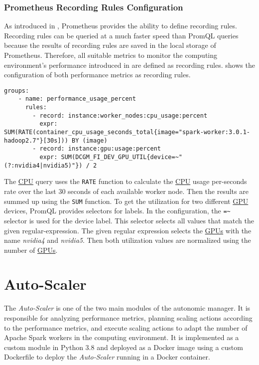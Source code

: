 \subsubsection{Prometheus Recording Rules Configuration}
%
As introduced in , Prometheus provides the ability to define recording rules. Recording rules can be queried at a much faster speed than PromQL queries because the results of recording rules are saved in the local storage of Prometheus.
%
Therefore, all suitable metrics to monitor the computing environment's performance introduced in  are defined as recording rules.
%
 shows the configuration of both performance metrics as recording rules.
%
\begin{lstlisting}[label=lst:06_env_depl_am_prom-rules, caption=Prometheus target configuration in YAML syntax]
groups:
    - name: performance_usage_percent
      rules:
        - record: instance:worker_nodes:cpu_usage:percent
          expr: SUM(RATE(container_cpu_usage_seconds_total{image="spark-worker:3.0.1-hadoop2.7"}[30s])) BY (image)
        - record: instance:gpu:usage:percent
          expr: SUM(DCGM_FI_DEV_GPU_UTIL{device=~"(?:nvidia4|nvidia5)"}) / 2
\end{lstlisting}
The \hyperlink{abbr:cpu}{CPU} query uses the \texttt{RATE} function to calculate the \hyperlink{abbr:cpu}{CPU} usage per-seconds rate over the last 30 seconds of each available worker node. Then the results are summed up using the \texttt{SUM} function.
To get the utilization for two different \hyperlink{abbr:gpu}{GPU} devices, PromQL provides selectors for labels. In the configuration, the \texttt{=\~} selector is used for the device label. This selector selects all values that match the given regular-expression. The given regular expression selects the \hyperlink{abbr:gpu}{GPUs} with the name \textit{nvidia4} and \textit{nvidia5}. Then both utilization values are normalized using the number of \hyperlink{abbr:gpu}{GPUs}.


\section{Auto-Scaler}
The \textit{Auto-Scaler} is one of the two main modules of the autonomic manager. It is responsible for analyzing performance metrics, planning scaling actions according to the performance metrics, and execute scaling actions to adapt the number of Apache Spark workers in the computing environment.
It is implemented as a custom module in Python 3.8 and deployed as a Docker image using a custom Dockerfile to deploy the \textit{Auto-Scaler} running in a Docker container.


